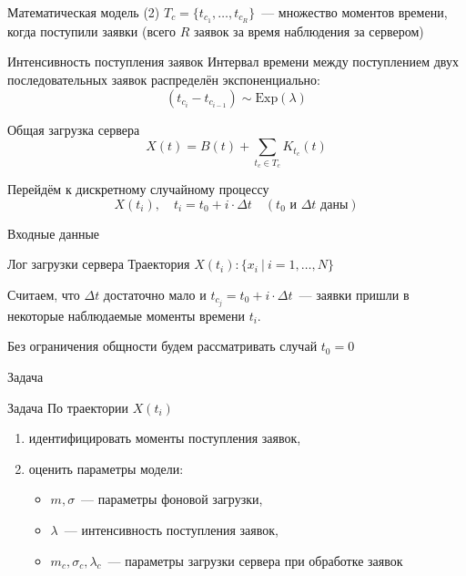 \documentclass[utf8]{beamer}
\begin{document}
\begin{frame}{Математическая модель (2)}
$T_c = \{ t_{c_1}, \ldots, t_{c_R} \}$~--- 
множество моментов времени, когда поступили заявки 
(всего $R$ заявок за время наблюдения за сервером)
\begin{block}{Интенсивность поступления заявок}
  Интервал времени между поступлением двух последовательных заявок распределён экспоненциально:
  $$(t_{c_i} - t_{c_{i-1}}) \sim \mathrm{Exp}(\lambda)$$
\end{block}
\begin{block}{Общая загрузка сервера}
  $$X(t) = B(t) + \sum\limits_{t_c \in T_c}K_{t_c}(t)$$
\end{block}
\begin{block}{Перейдём к дискретному случайному процессу}
  $$X(t_i), \quad t_i = t_0 + i \cdot \Delta t \quad 
    (t_0 \mathrm{\text{ и }} \Delta t \mathrm{\text{ даны}})$$
\end{block}
\end{frame}


\begin{frame}{Входные данные}
\begin{block}{Лог загрузки сервера}
  Траектория $X(t_i)\colon \{ x_i \ \vert\ i = 1, \ldots, N \}$
\end{block}
Считаем, что $\Delta t$ достаточно мало и $t_{c_j} = t_0 + i \cdot \Delta t$~---
заявки пришли в некоторые наблюдаемые моменты времени $t_i.$

Без ограничения общности будем рассматривать случай $t_0 = 0$
\end{frame}


\begin{frame}{Задача}
\begin{block}{Задача}
  По траектории $X(t_i)$ 
  \begin{enumerate}
    \item идентифицировать моменты поступления заявок,
    \item оценить параметры модели:
      \begin{itemize}
        \item $m, \sigma$~--- параметры фоновой загрузки,
        \item $\lambda$~--- интенсивность поступления заявок,
        \item $m_c, \sigma_c, \lambda_c$~--- параметры загрузки сервера при обработке заявок
      \end{itemize}
  \end{enumerate}
\end{block}
\end{frame}
\end{document}
